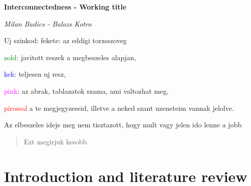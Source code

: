 \documentclass[12pt,bibliography=totoc]{article}
\begin{document}
\begin{titlepage}




 \begin{center}
\Huge\textbf{Interconnectedness - Working title}\\
 
\vspace{3cm}


 \Large\textit{Milan Badics - Balazs Kotro}
 
 \vspace{4cm}
Uj szinkod: fekete: az eddigi torzsszoveg

\textcolor{green}{zold}: javitott reszek a megbeszeles alapjan,

\textcolor{blue}{kek}: teljesen uj resz,

\textcolor{magenta}{pink}: az abrak, tablazatok szama, ami valtozhat meg,

\textcolor{red}{pirossal} a te megjegyzeseid, illetve a neked szant uzeneteim vannak jelolve.

Az elbeszeles ideje meg nem tisztazott, hogy mult vagy jelen ido lenne a jobb
\vspace{4cm}
\end{center}

\begin{abstract}
Ezt megirjuk kesobb
\end{abstract}


\end{titlepage}

\newpage

\section{Introduction and literature review}
\end{document}
